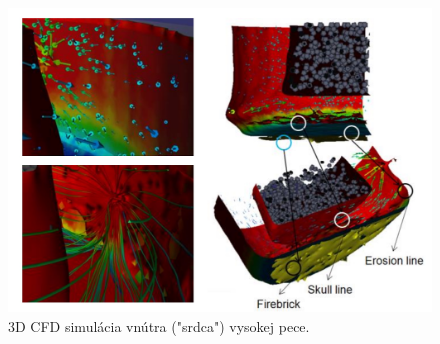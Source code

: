 \documentclass[]{tukediphc}
\begin{document}
\begin{figure}[!ht]
	\centering
	\includegraphics[width=.8\textwidth,angle=0]{figures/blast-furnace-erosion-vr.jpg}
	\caption{3D CFD simulácia vnútra ("srdca") vysokej pece.}
\end{figure}

\end{document}

